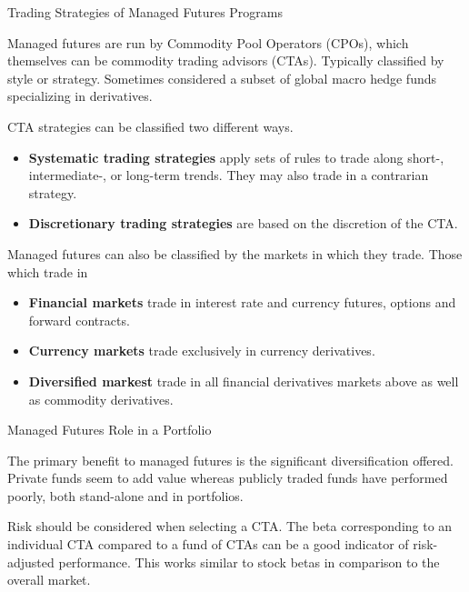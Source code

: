\documentclass[../custom]{flashcards}
\begin{document}
\begin{flashcard}{Trading Strategies of Managed Futures Programs}
    \begin{flushleft}
        Managed futures are run by Commodity Pool Operators (CPOs), which themselves can be commodity trading advisors (CTAs). Typically classified by style or strategy. Sometimes considered a subset of global macro hedge funds specializing in derivatives.\newline

        CTA strategies can be classified two different ways.
        \begin{itemize}
            \item \textbf{Systematic trading strategies} apply sets of rules to trade along short-, intermediate-, or long-term trends. They may also trade in a contrarian strategy.
            \item \textbf{Discretionary trading strategies} are based on the discretion of the CTA.
        \end{itemize}

        Managed futures can also be classified by the markets in which they trade. Those which trade in
        \begin{itemize}
            \item \textbf{Financial markets} trade in interest rate and currency futures, options and forward contracts.
            \item \textbf{Currency markets} trade exclusively in currency derivatives.
            \item \textbf{Diversified markest} trade in all financial derivatives markets above as well as commodity derivatives.
        \end{itemize}
    \end{flushleft}
\end{flashcard}

\begin{flashcard}{Managed Futures Role in a Portfolio}
    \begin{flushleft}
        The primary benefit to managed futures is the significant diversification offered. Private funds seem to add value whereas publicly traded funds have performed poorly, both stand-alone and in portfolios.\newline

        Risk should be considered when selecting a CTA. The beta corresponding to an individual CTA compared to a fund of CTAs can be a good indicator of risk-adjusted performance. This works similar to stock betas in comparison to the overall market.
    \end{flushleft}
\end{flashcard}
\end{document}
